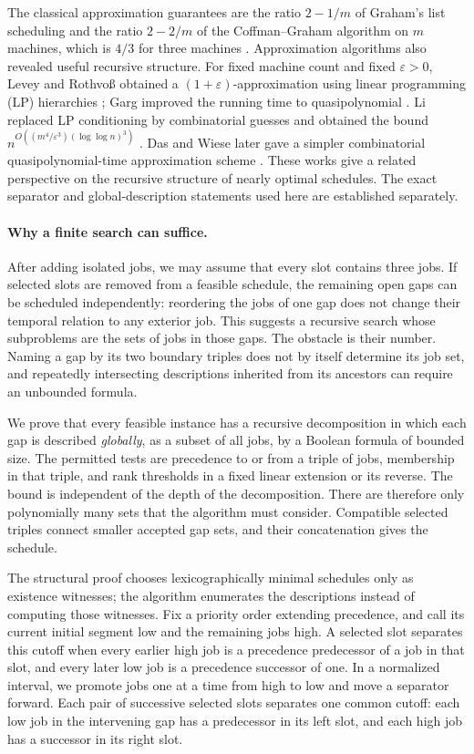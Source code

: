 \documentclass[11pt]{article}
\numberwithin{equation}{section}
\theoremstyle{definition}
\theoremstyle{remark}
\begin{document}
The classical approximation guarantees are the ratio \(2-1/m\) of
Graham's list scheduling \citep{Graham1966} and the ratio \(2-2/m\) of
the Coffman--Graham algorithm on \(m\) machines, which is \(4/3\) for
three machines \citep{LamSethi1977}.
Approximation algorithms also revealed useful recursive structure.
For fixed machine count and fixed \(\varepsilon>0\), Levey and Rothvoß
obtained a \((1+\varepsilon)\)-approximation using linear programming
(LP) hierarchies
\citep{LeveyRothvoss2016}; Garg improved the running time to
quasipolynomial \citep{Garg2018}. Li replaced LP conditioning by
combinatorial guesses and obtained the bound
\(n^{O((m^4/\varepsilon^3)(\log\log n)^3)}\) \citep{Li2021}.
Das and Wiese later gave a simpler combinatorial quasipolynomial-time
approximation scheme \citep{DasWiese2022}.
These works give a related perspective on the recursive structure of
nearly optimal schedules. The exact separator and global-description
statements used here are established separately.

\paragraph{Why a finite search can suffice.}
After adding isolated jobs, we may assume that every slot contains three
jobs. If selected slots are removed from a feasible schedule, the remaining
open gaps can be scheduled independently: reordering the jobs of one gap
does not change their temporal relation to any exterior job. This suggests
a recursive search whose subproblems are the sets of jobs in those gaps.
The obstacle is their number. Naming a gap by its two boundary triples
does not by itself determine its job set, and repeatedly intersecting
descriptions inherited from its ancestors can require an unbounded formula.

We prove that every feasible instance has a recursive decomposition in
which each gap is described \emph{globally}, as a subset of all jobs, by a
Boolean formula of bounded size. The permitted tests are precedence to or
from a triple of jobs, membership in that triple, and rank thresholds in
a fixed linear extension or its reverse. The bound is independent of the
depth of the decomposition. There are therefore only polynomially many
sets that the algorithm must consider. Compatible selected triples connect
smaller accepted gap sets, and their concatenation gives the schedule.

The structural proof chooses lexicographically minimal schedules only as
existence witnesses; the algorithm enumerates the descriptions instead of
computing those witnesses. Fix a priority order extending precedence,
and call its current initial segment low and the remaining jobs high.
A selected slot separates this cutoff when every earlier high job is a
precedence predecessor of a job in that slot, and every later low job is
a precedence successor of one. In a normalized interval, we promote
jobs one at a time from high to low and move a separator forward. Each pair
of successive selected slots separates one common cutoff: each low job
in the intervening gap has a predecessor in its left slot, and each high
job has a successor in its right slot.
\end{document}
